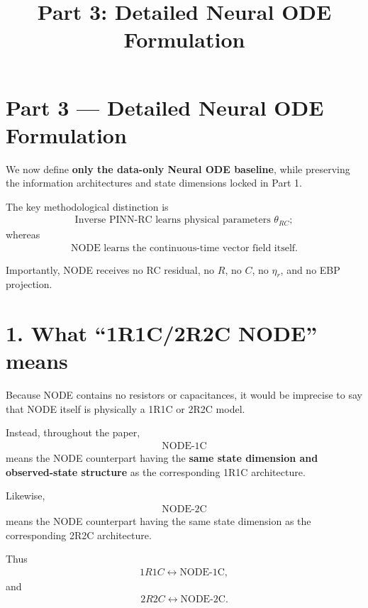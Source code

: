 \documentclass[11pt]{article}
\title{Part 3: Detailed Neural ODE Formulation}
\author{}
\date{}
\begin{document}
\maketitle

\section*{Part 3 --- Detailed Neural ODE Formulation}

We now define \textbf{only the data-only Neural ODE baseline}, while preserving the information architectures and state dimensions locked in Part 1.

The key methodological distinction is
\begin{align}
\boxed{\text{Inverse PINN-RC learns physical parameters } \theta_{RC};}
\end{align}
whereas
\begin{align}
\boxed{\text{NODE learns the continuous-time vector field itself.}}
\end{align}

Importantly, NODE receives no RC residual, no \(R\), no \(C\), no \(\eta_r\), and no EBP projection.

\section*{1. What ``1R1C/2R2C NODE'' means}

Because NODE contains no resistors or capacitances, it would be imprecise to say that NODE itself is physically a 1R1C or 2R2C model.

Instead, throughout the paper,
\begin{align}
\boxed{\text{NODE-1C}}
\end{align}
means the NODE counterpart having the \textbf{same state dimension and observed-state structure} as the corresponding 1R1C architecture.

Likewise,
\begin{align}
\boxed{\text{NODE-2C}}
\end{align}
means the NODE counterpart having the same state dimension as the corresponding 2R2C architecture.

Thus
\begin{align}
\boxed{1R1C\leftrightarrow\text{NODE-1C}},
\end{align}
and
\begin{align}
\boxed{2R2C\leftrightarrow\text{NODE-2C}.}
\end{align}
\end{document}
